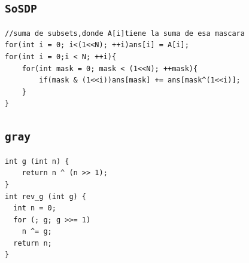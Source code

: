 \subsection{\texttt{SoSDP}}
\begin{lstlisting}
//suma de subsets,donde A[i]tiene la suma de esa mascara
for(int i = 0; i<(1<<N); ++i)ans[i] = A[i];
for(int i = 0;i < N; ++i){
    for(int mask = 0; mask < (1<<N); ++mask){
        if(mask & (1<<i))ans[mask] += ans[mask^(1<<i)];
    }
}\end{lstlisting}

\subsection{\texttt{gray}}
\begin{lstlisting}
int g (int n) {
    return n ^ (n >> 1);
}
int rev_g (int g) {
  int n = 0;
  for (; g; g >>= 1)
    n ^= g;
  return n;
}\end{lstlisting}


